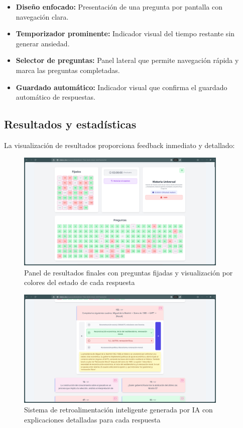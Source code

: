 \documentclass[12pt,a4paper]{report}
\begin{document}
\begin{itemize}
\item \textbf{Diseño enfocado:} Presentación de una pregunta por pantalla con navegación clara.
\item \textbf{Temporizador prominente:} Indicador visual del tiempo restante sin generar ansiedad.
\item \textbf{Selector de preguntas:} Panel lateral que permite navegación rápida y marca las preguntas completadas.
\item \textbf{Guardado automático:} Indicador visual que confirma el guardado automático de respuestas.
\end{itemize}

\subsection{Resultados y estadísticas}

La visualización de resultados proporciona feedback inmediato y detallado:

\begin{figure}[h]
\centering
\includegraphics[width=0.9\textwidth]{assets/250617_06h48m58s_screenshot.png}
\caption{Panel de resultados finales con preguntas fijadas y visualización por colores del estado de cada respuesta}
\label{fig:resultados-finales}
\end{figure}

\begin{figure}[h]
\centering
\includegraphics[width=0.9\textwidth]{assets/250617_06h49m09s_screenshot.png}
\caption{Sistema de retroalimentación inteligente generada por IA con explicaciones detalladas para cada respuesta}
\label{fig:feedback-ia}
\end{figure}
\end{document}
